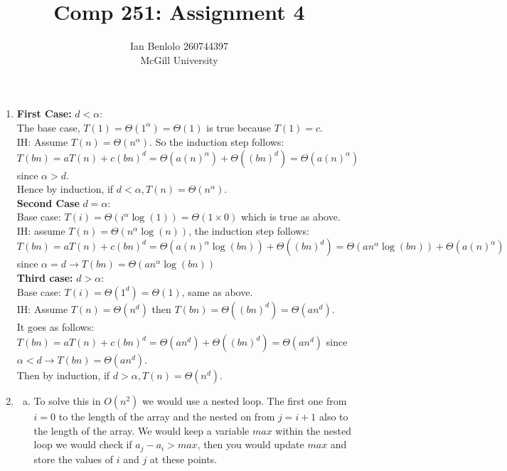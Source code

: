 
\usepackage{cancel}
\usepackage{verbatim}
\usepackage{graphicx}
\usepackage{enumerate}
\usepackage{appendix}
\title{Comp 251: Assignment 4}
\author{Ian Benlolo 260744397\\McGill University \\}

\maketitle
\begin{enumerate}[1.]
\item 
\textbf{First Case:} $d<\alpha$: \\
The base case, $T(1)=\Theta(1^{\alpha})=\Theta(1)$ is true because $T(1)=c$.\\
IH: Assume $T(n)=\Theta(n^{\alpha})$. So the induction step follows:\\
$T(bn)= aT(n)+c(bn)^d=\Theta(a(n)^{\alpha})+\Theta((bn)^{d})=\Theta(a(n)^{\alpha})$ since $\alpha > d$.\\
Hence by induction, if $d<\alpha, T(n)=\Theta(n^{\alpha})$.\\

\textbf{Second Case} $d=\alpha$:\\
Base case: $T(i)=\Theta(i^{\alpha}\log(1))=\Theta(1\times0)$ which is true as above.\\
IH: assume $T(n)=\Theta(n^{\alpha}\log(n))$, the induction step follows:\\
$T(bn)=aT(n)+c(bn)^d=\Theta(a(n)^{\alpha}\log(bn))+\Theta((bn)^d)=\Theta(an^{\alpha}\log(bn))+\Theta(a(n)^{\alpha})$ since $\alpha=d \rightarrow T(bn)=\Theta(an^{\alpha}\log(bn))$\\

\textbf{Third case: }$ d>\alpha$:\\
Base case: $T(i)=\Theta(1^d)=\Theta(1)$, same as above.\\
IH: Assume $T(n)=\Theta(n^d)$ then $T(bn)=\Theta((bn)^d)=\Theta(an^d)$.\\
It goes as follows:\\
$T(bn)=aT(n)+c(bn)^d=\Theta(an^d)+\Theta((bn)^d)=\Theta(an^d)$ since $\alpha<d \rightarrow T(bn)=\Theta(an^d)$.\\
Then by induction, if $d>\alpha, T(n)=\Theta(n^d)$.


\item 
	\begin{enumerate}[(a)]
	\item
	To solve this in $O(n^2)$ we would use a nested loop. The first one from $i=0$ to the length of the array and the nested on from $j=i+1$  also to the length of the array. We would keep a variable $max$ within the nested loop we would  check if $a_j-a_i>max$, then you would update $max$ and store the values of $i$ and $j$ at these points. \\
	

\end{enumerate}
\end{enumerate}
